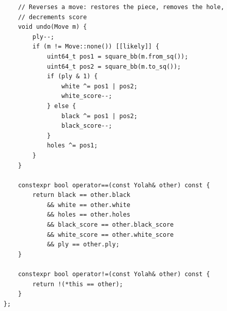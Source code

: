 \documentclass[12pt,a4paper,twoside,openright]{book}
\begin{document}
\begin{mdframed}[skipabove=\baselineskip,topline=false,rightline=false,bottomline=false,leftline=false,linewidth=1pt,linecolor=gray!40,innerleftmargin=8pt]
\begin{verbatim}
    // Reverses a move: restores the piece, removes the hole, 
    // decrements score
    void undo(Move m) {
        ply--;
        if (m != Move::none()) [[likely]] {
            uint64_t pos1 = square_bb(m.from_sq());
            uint64_t pos2 = square_bb(m.to_sq());
            if (ply & 1) {
                white ^= pos1 | pos2;
                white_score--;
            } else {
                black ^= pos1 | pos2;
                black_score--;
            }
            holes ^= pos1;
        }
    }

    constexpr bool operator==(const Yolah& other) const {
        return black == other.black
            && white == other.white
            && holes == other.holes
            && black_score == other.black_score
            && white_score == other.white_score
            && ply == other.ply;
    }

    constexpr bool operator!=(const Yolah& other) const {
        return !(*this == other);
    }
};
\end{verbatim}
\label{lst:board_code_3}
\end{mdframed}
\end{document}
